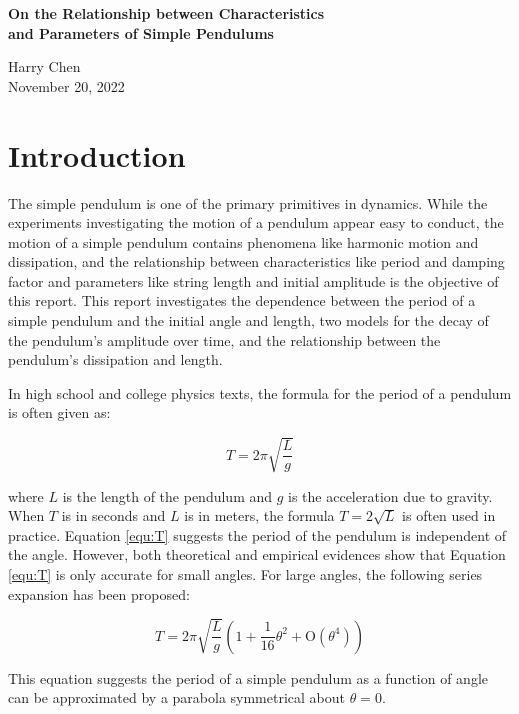 \documentclass[12pt]{article}
\begin{document}
\begin{center}

\bf{\LARGE
On the Relationship between Characteristics \\ and Parameters of Simple Pendulums
}

\rm{\large
Harry Chen\\
November 20, 2022
}

\end{center}


\section{Introduction}

The simple pendulum is one of the primary primitives in dynamics. While the experiments investigating the motion of a pendulum appear easy to conduct, the motion of a simple pendulum contains phenomena like harmonic motion and dissipation, and the relationship between characteristics like period and damping factor and parameters like string length and initial amplitude is the objective of this report. This report investigates the dependence between the period of a simple pendulum and the initial angle and length, two models for the decay of the pendulum's amplitude over time, and the relationship between the pendulum's dissipation and length.

In high school and college physics texts, the formula for the period of a pendulum is often given as: ~\cite{openstax-physics}

\begin{equation}
\label{equ:T}
T=2\pi\sqrt{\frac{L}{g}}
\end{equation}

where $L$ is the length of the pendulum and $g$ is the acceleration due to gravity. When $T$ is in seconds and $L$ is in meters, the formula $T=2\sqrt{L}$ is often used in practice. Equation \ref{equ:T} suggests the period of the pendulum is independent of the angle. However, both theoretical and empirical evidences show that Equation {\ref{equ:T}} is only accurate for small angles. For large angles, the following series expansion has been proposed: ~\cite{hyperphysics-pendl}

\begin{equation}
\label{equ:T1}
T=2\pi\sqrt{\frac{L}{g}}\left(1+\frac{1}{16}\theta^2+\mathrm{O}\left(\theta^4\right)\right)
\end{equation}

This equation suggests the period of a simple pendulum as a function of angle can be approximated by a parabola symmetrical about $\theta=0$.
\end{document}
